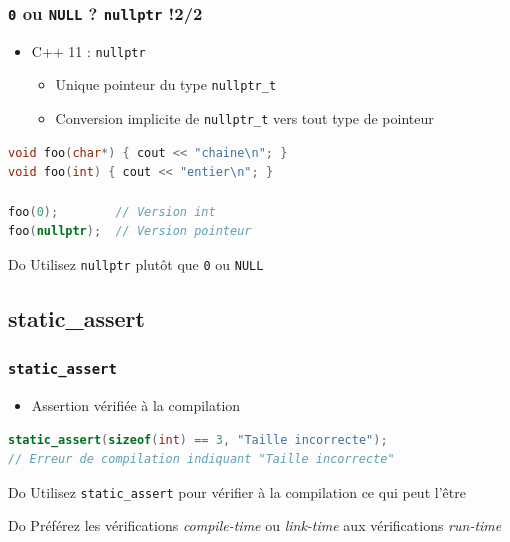 \documentclass[C++.tex]{subfiles}
\begin{document}
\begin{frame}[fragile]
	\frametitle{\lstinline|0| ou \lstinline|NULL| ? \lstinline|nullptr| !\titlehfill{}2/2}
	\begin{itemize}
		\item C++ 11 : \lstinline|nullptr|
		\begin{itemize}
			\item Unique pointeur du type \lstinline|nullptr_t|
			\item Conversion implicite de \lstinline|nullptr_t| vers tout type de pointeur
		\end{itemize}
	\end{itemize}

	\begin{lstlisting}[language=C++]
void foo(char*) { cout << "chaine\n"; }
void foo(int) { cout << "entier\n"; }

foo(0);        // Version int
foo(nullptr);  // Version pointeur\end{lstlisting}

	\begin{exampleblock}{Do}
		Utilisez \lstinline|nullptr| plutôt que \lstinline|0| ou \lstinline|NULL|
	\end{exampleblock}
\end{frame}

\subsection*{static\_assert}
\begin{frame}[fragile]
	\frametitle{\lstinline|static_assert|}
	\begin{itemize}
		\item Assertion vérifiée à la compilation
	\end{itemize}

	\begin{lstlisting}[language=C++]
static_assert(sizeof(int) == 3, "Taille incorrecte");
// Erreur de compilation indiquant "Taille incorrecte"\end{lstlisting}

	\begin{exampleblock}{Do}
		Utilisez \lstinline|static_assert| pour vérifier à la compilation ce qui peut l'être
	\end{exampleblock}

	\begin{exampleblock}{Do}
		Préférez les vérifications \textit{compile-time} ou \textit{link-time} aux vérifications \textit{run-time}

	\end{exampleblock}
\end{frame}
\end{document}
